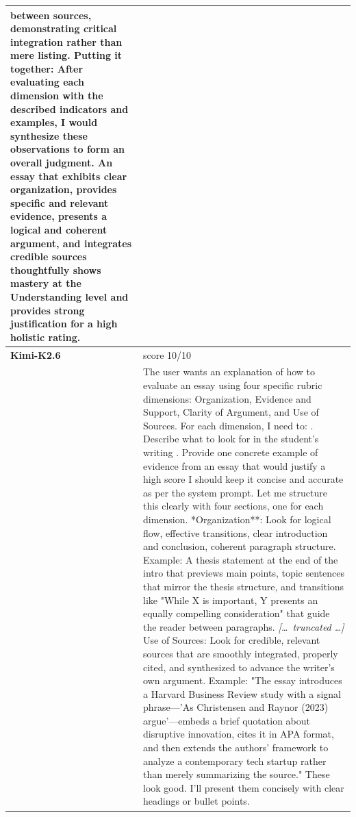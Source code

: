 \begin{longtable}{@{}l p{12.5cm}@{}}
between sources, demonstrating critical integration rather than mere listing. \newline Putting it together: After evaluating each dimension with the described indicators and examples, I would synthesize these observations to form an overall judgment. An essay that exhibits clear organization, provides specific and relevant evidence, presents a logical and coherent argument, and integrates credible sources thoughtfully shows mastery at the Understanding level and provides strong justification for a high holistic rating. \\
  \midrule
  \textbf{Kimi-K2.6} & score 10/10 \\
  & The user wants an explanation of how to evaluate an essay using four specific rubric dimensions: Organization, Evidence and Support, Clarity of Argument, and Use of Sources. For each dimension, I need to: \newline 1. Describe what to look for in the student's writing \newline 2. Provide one concrete example of evidence from an essay that would justify a high score \newline I should keep it concise and accurate as per the system prompt. \newline Let me structure this clearly with four sections, one for each dimension. \newline **Organization**: Look for logical flow, effective transitions, clear introduction and conclusion, coherent paragraph structure. Example: A thesis statement at the end of the intro that previews main points, topic sentences that mirror the thesis structure, and transitions like "While X is important, Y presents an equally compelling consideration" that guide the reader between paragraphs. \newline \textit{[\ldots\ truncated \ldots]} \newline Use of Sources: Look for credible, relevant sources that are smoothly integrated, properly cited, and synthesized to advance the writer's own argument. Example: "The essay introduces a Harvard Business Review study with a signal phrase---'As Christensen and Raynor (2023) argue'---embeds a brief quotation about disruptive innovation, cites it in APA format, and then extends the authors' framework to analyze a contemporary tech startup rather than merely summarizing the source." \newline These look good. I'll present them concisely with clear headings or bullet points. \\

\end{longtable}

